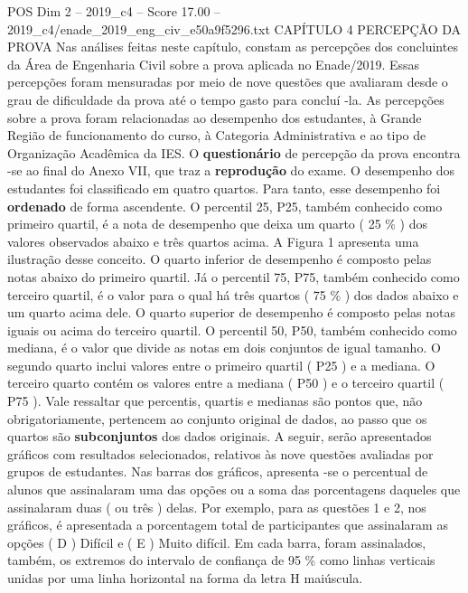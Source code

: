 \begin{textsample}{POS Dim 2 – 2019\_c4 – Score 17.00 – 2019\_c4/enade\_2019\_eng\_civ\_e50a9f5296.txt}  \label{ex:f2_pos_049}
CAPÍTULO 4 PERCEPÇÃO DA PROVA Nas análises feitas neste capítulo, constam as percepções dos concluintes da Área de Engenharia Civil sobre a prova aplicada no Enade/2019.
Essas percepções foram mensuradas por meio de nove questões que avaliaram desde o grau de dificuldade da prova até o tempo gasto para concluí -la.
As percepções sobre a prova foram relacionadas ao desempenho dos estudantes, à Grande Região de funcionamento do curso, à Categoria Administrativa e ao tipo de Organização Acadêmica da IES.
O \textbf{questionário} de percepção da prova encontra -se ao final do Anexo VII, que traz a \textbf{reprodução} do exame.
O desempenho dos estudantes foi classificado em quatro quartos.
Para tanto, esse desempenho foi \textbf{ordenado} de forma ascendente.
O percentil 25, P25, também conhecido como primeiro quartil, é a nota de desempenho que deixa um quarto ( 25 \% ) dos valores observados abaixo e três quartos acima.
A Figura 1 apresenta uma ilustração desse conceito.
O quarto inferior de desempenho é composto pelas notas abaixo do primeiro quartil.
Já o percentil 75, P75, também conhecido como terceiro quartil, é o valor para o qual há três quartos ( 75 \% ) dos dados abaixo e um quarto acima dele.
O quarto superior de desempenho é composto pelas notas iguais ou acima do terceiro quartil.
O percentil 50, P50, também conhecido como mediana, é o valor que divide as notas em dois conjuntos de igual tamanho.
O segundo quarto inclui valores entre o primeiro quartil ( P25 ) e a mediana.
O terceiro quarto contém os valores entre a mediana ( P50 ) e o terceiro quartil ( P75 ).
Vale ressaltar que percentis, quartis e medianas são pontos que, não obrigatoriamente, pertencem ao conjunto original de dados, ao passo que os quartos são \textbf{subconjuntos} dos dados originais.
A seguir, serão apresentados gráficos com resultados selecionados, relativos às nove questões avaliadas por grupos de estudantes.
Nas barras dos gráficos, apresenta -se o percentual de alunos que assinalaram uma das opções ou a soma das porcentagens daqueles que assinalaram duas ( ou três ) delas.
Por exemplo, para as questões 1 e 2, nos gráficos, é apresentada a porcentagem total de participantes que assinalaram as opções ( D ) Difícil e ( E ) Muito difícil.
Em cada barra, foram assinalados, também, os extremos do intervalo de confiança de 95 \% como linhas verticais unidas por uma linha horizontal na forma da letra H maiúscula.

\end{textsample}
